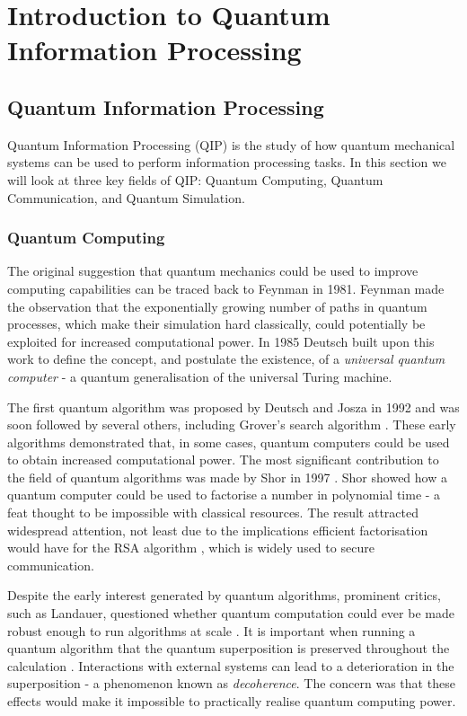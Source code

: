 \chapter{Introduction to Quantum Information Processing} 
\label{ch:QuantumInformationProcessing}

\section{Quantum Information Processing}

Quantum Information Processing (QIP) is the study of how quantum mechanical systems can be used to perform information processing tasks. In this section we will look at three key fields of QIP: Quantum Computing, Quantum Communication, and Quantum Simulation.

\subsection{Quantum Computing}

The original suggestion that quantum mechanics could be used to improve computing capabilities can be traced back to Feynman \cite{feynman_82} in 1981. Feynman made the observation that the exponentially growing number of paths in quantum processes, which make their simulation hard classically, could potentially be exploited for increased computational power. In 1985 Deutsch built upon this work to define the concept, and postulate the existence, of a \textit{universal quantum computer} \cite{deutsch_85} - a quantum generalisation of the universal Turing machine. 

The first quantum algorithm was proposed by Deutsch and Josza \cite{deutsch_jozsa_92} in 1992 and was soon followed by several others, including Grover's search algorithm \cite{simon_94, grovers_search}. These early algorithms demonstrated that, in some cases, quantum computers could be used to obtain increased computational power. The most significant contribution to the field of quantum algorithms was made by Shor in 1997 \cite{shors_algorithm}. Shor showed how a quantum computer could be used to factorise a number in polynomial time - a feat thought to be impossible with classical resources. The result attracted widespread attention, not least due to the implications efficient factorisation would have for the RSA algorithm \cite{rsa}, which is widely used to secure communication.

Despite the early interest generated by quantum algorithms, prominent critics, such as Landauer, questioned whether quantum computation could ever be made robust enough to run algorithms at scale \cite{landauer_96}. It is important when running a quantum algorithm that the quantum superposition is preserved throughout the calculation \cite{nature_cq_review_10}. Interactions with external systems can lead to a deterioration in the superposition - a phenomenon known as \textit{decoherence}. The concern was that these effects would make it impossible to practically realise quantum computing power.

